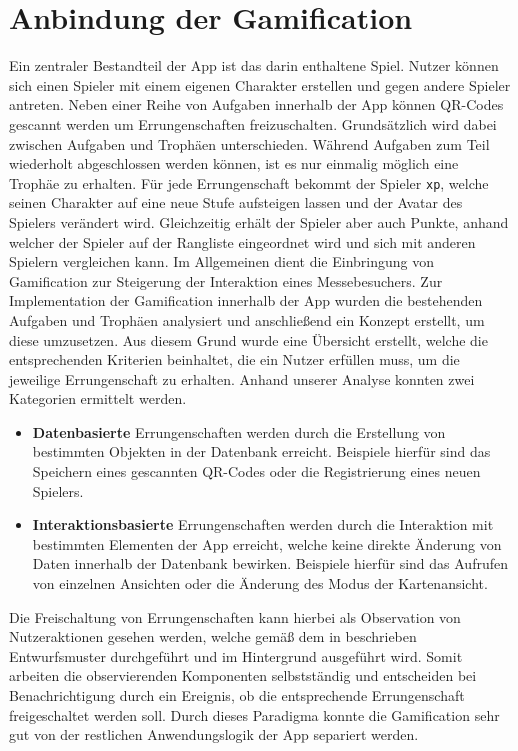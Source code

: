 \newpage

\section{Anbindung der Gamification}

Ein zentraler Bestandteil der App ist das darin enthaltene Spiel. Nutzer können sich einen Spieler mit einem eigenen Charakter erstellen und gegen andere Spieler antreten. Neben einer Reihe von Aufgaben innerhalb der App können QR-Codes gescannt werden um Errungenschaften freizuschalten. Grundsätzlich wird dabei zwischen Aufgaben und Trophäen unterschieden. Während Aufgaben zum Teil wiederholt abgeschlossen werden können, ist es nur einmalig möglich eine Trophäe zu erhalten. Für jede Errungenschaft bekommt der Spieler \texttt{xp}, welche seinen Charakter auf eine neue Stufe aufsteigen lassen und der Avatar des Spielers verändert wird. Gleichzeitig erhält der Spieler aber auch Punkte, anhand welcher der Spieler auf der Rangliste eingeordnet wird und sich mit anderen Spielern vergleichen kann. Im Allgemeinen dient die Einbringung von Gamification zur Steigerung der Interaktion eines Messebesuchers. Zur Implementation der Gamification innerhalb der App wurden die bestehenden Aufgaben und Trophäen analysiert und anschließend ein Konzept erstellt, um diese umzusetzen. Aus diesem Grund wurde eine Übersicht erstellt, welche die entsprechenden Kriterien beinhaltet, die ein Nutzer erfüllen muss, um die jeweilige Errungenschaft zu erhalten. Anhand unserer Analyse konnten zwei Kategorien ermittelt werden.

\begin{itemize}
    \item \textbf{Datenbasierte} Errungenschaften werden durch die Erstellung von bestimmten Objekten in der Datenbank erreicht. Beispiele hierfür sind das Speichern eines gescannten QR-Codes oder die Registrierung eines neuen Spielers.
    \item \textbf{Interaktionsbasierte} Errungenschaften werden durch die Interaktion mit bestimmten Elementen der App erreicht, welche keine direkte Änderung von Daten innerhalb der Datenbank bewirken. Beispiele hierfür sind das Aufrufen von einzelnen Ansichten oder die Änderung des Modus der Kartenansicht.
\end{itemize}

Die Freischaltung von Errungenschaften kann hierbei als Observation von Nutzeraktionen gesehen werden, welche gemäß dem in  beschrieben Entwurfsmuster durchgeführt und im Hintergrund ausgeführt wird. Somit arbeiten die observierenden Komponenten selbstständig und entscheiden bei Benachrichtigung durch ein Ereignis, ob die entsprechende Errungenschaft freigeschaltet werden soll. Durch dieses Paradigma konnte die Gamification sehr gut von der restlichen Anwendungslogik der App separiert werden. 

